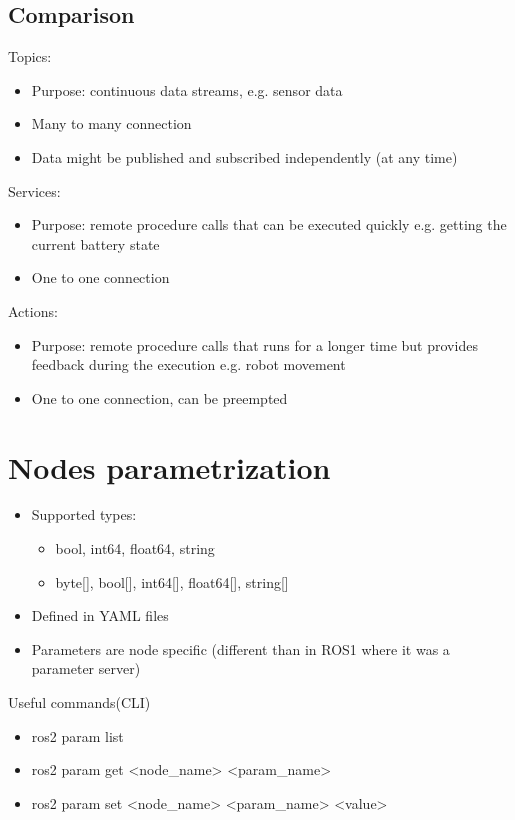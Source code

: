 \subsection{Comparison}
Topics:
\begin{itemize}
        \item Purpose: continuous data streams, e.g. sensor data
        \item Many to many connection
        \item Data might be published and subscribed independently (at any time)
\end{itemize}
Services:
\begin{itemize}
        \item Purpose: remote procedure calls that can be executed quickly e.g. getting the current battery state
        \item One to one connection
\end{itemize}
Actions:
\begin{itemize}
        \item Purpose: remote procedure calls that runs for a longer time but provides feedback during the execution e.g. robot movement
        \item One to one connection, can be preempted
\end{itemize}


\section{Nodes parametrization}

\begin{itemize}
        \item Supported types:
            \begin{itemize}
                    \item bool, int64, float64, string
                    \item byte[], bool[], int64[], float64[], string[]
                    
            \end{itemize}
        \item Defined in YAML files
        \item Parameters are node specific (different than in ROS1 where it was a parameter server)

\end{itemize}

\nt
{
    Useful commands(CLI)
    \begin{itemize}
            \item ros2 param list
            \item ros2 param get <node\_name> <param\_name>
            \item ros2 param set <node\_name> <param\_name> <value>
    \end{itemize}
}


